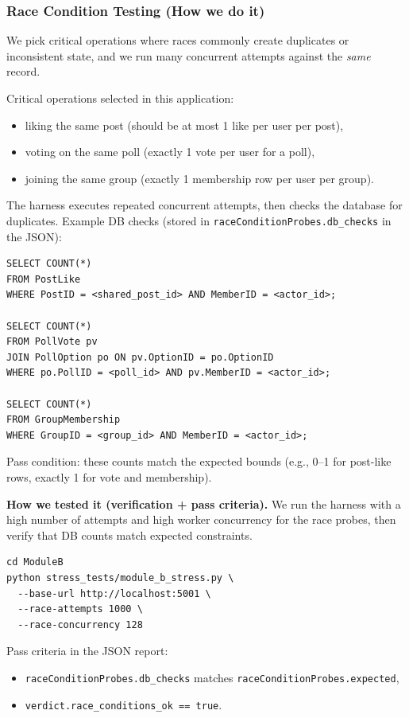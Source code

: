 \documentclass[12pt,a4paper]{article}
\begin{document}
\subsubsection{Race Condition Testing (How we do it)}
We pick critical operations where races commonly create duplicates or inconsistent state, and we run many concurrent attempts against the \emph{same} record.

Critical operations selected in this application:
\begin{itemize}[noitemsep]
  \item liking the same post (should be at most 1 like per user per post),
  \item voting on the same poll (exactly 1 vote per user for a poll),
  \item joining the same group (exactly 1 membership row per user per group).
\end{itemize}

The harness executes repeated concurrent attempts, then checks the database for duplicates. Example DB checks (stored in \texttt{raceConditionProbes.db\_checks} in the JSON):
\begin{lstlisting}[basicstyle=\ttfamily\small, caption={Representative race-condition DB checks (no duplicates)}]
SELECT COUNT(*)
FROM PostLike
WHERE PostID = <shared_post_id> AND MemberID = <actor_id>;

SELECT COUNT(*)
FROM PollVote pv
JOIN PollOption po ON pv.OptionID = po.OptionID
WHERE po.PollID = <poll_id> AND pv.MemberID = <actor_id>;

SELECT COUNT(*)
FROM GroupMembership
WHERE GroupID = <group_id> AND MemberID = <actor_id>;
\end{lstlisting}

Pass condition: these counts match the expected bounds (e.g., 0--1 for post-like rows, exactly 1 for vote and membership).

\textbf{How we tested it (verification + pass criteria).}
We run the harness with a high number of attempts and high worker concurrency for the race probes, then verify that DB counts match expected constraints.

\begin{lstlisting}[basicstyle=\ttfamily\small, caption={Race-condition test run command (Module B)}]
cd ModuleB
python stress_tests/module_b_stress.py \
  --base-url http://localhost:5001 \
  --race-attempts 1000 \
  --race-concurrency 128
\end{lstlisting}

Pass criteria in the JSON report:
\begin{itemize}[noitemsep]
  \item \texttt{raceConditionProbes.db\_checks} matches \texttt{raceConditionProbes.expected},
  \item \texttt{verdict.race\_conditions\_ok == true}.
\end{itemize}
\end{document}
